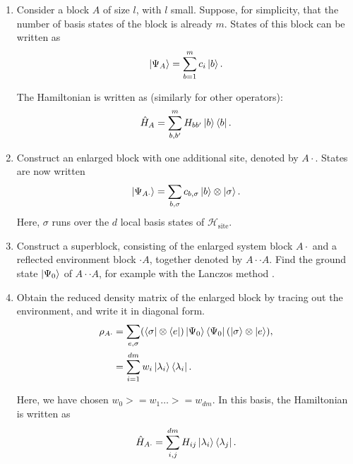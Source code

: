 \begin{enumerate}
  \item \label{step1} Consider a block $A$ of size $l$, with $l$ small. Suppose, for
  simplicity, that the number of basis states of the block is already
  $m$. States of this block can be written as
  \begin{equation}
    \ket{\Psi_A} = \sum_{b = 1}^{m} c_{i} \ket{b}.
  \end{equation}

  The Hamiltonian is written as (similarly for other operators):
  \begin{equation}
    \hat{H}_{A} = \sum_{b, b'}^{m} H_{b b'} \ket{b} \bra{b}.
  \end{equation}

  \item Construct an enlarged block with one additional site, denoted by $A
  \cdot$. States are now written
  \begin{equation}
    \ket{\Psi_{A\cdot}} = \sum_{b, \sigma} c_{b, \sigma} \ket{b} \otimes \ket{\sigma}.
  \end{equation}
  Here, $\sigma$ runs over the $d$ local basis states of $\mathcal{H}_{\text{site}}$.

  \item Construct a superblock, consisting of the enlarged system block $A
  \cdot$ and a reflected environment block $\cdot A$, together denoted by $A \cdot
  \cdot A$. Find the ground state $\ket{\Psi_0}$ of $A \cdot \cdot A$, for example
  with the Lanczos method \cite{lehoucq1996deflation}.

  \item Obtain the reduced density matrix of the enlarged block by tracing out
  the environment, and write it in diagonal form.
  \begin{equation}
  \begin{aligned}
    \rho_{A \cdot} & = \sum_{e, \sigma} (\bra{\sigma} \otimes \bra{e}) \ket{\Psi_0}
    \bra{\Psi_0} (\ket{\sigma} \otimes \ket{e}), \\
    & = \sum_{i = 1}^{d m} w_{i} \ket{\lambda_i} \bra{\lambda_i}.
  \end{aligned}
  \end{equation}

  Here, we have chosen $w_0 >= w_1 \ldots >= w_{d m}$. In this basis, the Hamiltonian is
  written as
  \begin{equation}
    \hat{H}_{A \cdot} = \sum_{i, j}^{d m} H_{ij} \ket{\lambda_i}\bra{\lambda_j}.
  \end{equation}


\end{enumerate}
